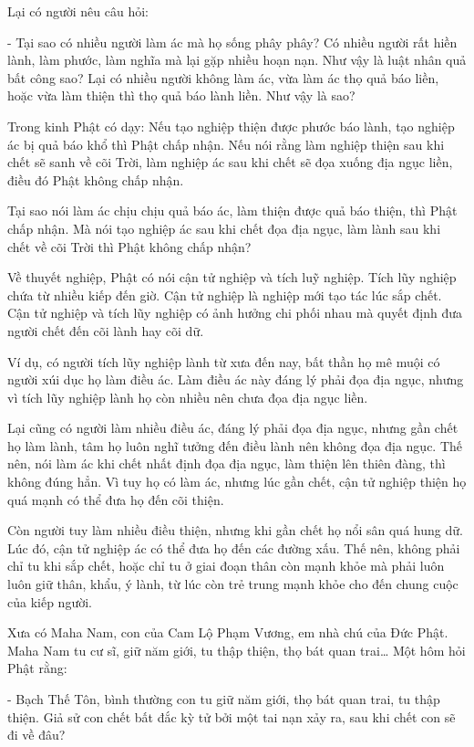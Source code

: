 \documentclass[
  12pt,
  oneside]{book}
\begin{document}
Lại có người nêu câu hỏi:

- Tại sao có nhiều người làm ác mà họ sống phây phây? Có nhiều người rất hiền lành, làm phước, làm nghĩa mà lại gặp nhiều hoạn nạn. Như vậy là luật nhân quả bất công sao? Lại có nhiều người không làm ác, vừa làm ác thọ quả báo liền, hoặc vừa làm thiện thì thọ quả báo lành liền. Như vậy là sao?

Trong kinh Phật có dạy: Nếu tạo nghiệp thiện được phước báo lành, tạo nghiệp ác bị quả báo khổ thì Phật chấp nhận. Nếu nói rằng làm nghiệp thiện sau khi chết sẽ sanh về cõi Trời, làm nghiệp ác sau khi chết sẽ đọa xuống địa ngục liền, điều đó Phật không chấp nhận.

Tại sao nói làm ác chịu chịu quả báo ác, làm thiện được quả báo thiện, thì Phật chấp nhận. Mà nói tạo nghiệp ác sau khi chết đọa địa ngục, làm lành sau khi chết về cõi Trời thì Phật không chấp nhận?

Về thuyết nghiệp, Phật có nói cận tử nghiệp và tích luỹ nghiệp. Tích lũy nghiệp chứa từ nhiều kiếp đến giờ. Cận tử nghiệp là nghiệp mới tạo tác lúc sắp chết. Cận tử nghiệp và tích lũy nghiệp có ảnh hưởng chi phối nhau mà quyết định đưa người chết đến cõi lành hay cõi dữ.

Ví dụ, có người tích lũy nghiệp lành từ xưa đến nay, bất thần họ mê muội có người xúi dục họ làm điều ác. Làm điều ác này đáng lý phải đọa địa ngục, nhưng vì tích lũy nghiệp lành họ còn nhiều nên chưa đọa địa ngục liền.

Lại cũng có người làm nhiều điều ác, đáng lý phải đọa địa ngục, nhưng gần chết họ làm lành, tâm họ luôn nghĩ tưởng đến điều lành nên không đọa địa ngục. Thế nên, nói làm ác khi chết nhất định đọa địa ngục, làm thiện lên thiên đàng, thì không đúng hẳn. Vì tuy họ có làm ác, nhưng lúc gần chết, cận tử nghiệp thiện họ quá mạnh có thể đưa họ đến cõi thiện.

Còn người tuy làm nhiều điều thiện, nhưng khi gần chết họ nổi sân quá hung dữ. Lúc đó, cận tử nghiệp ác có thể đưa họ đến các đường xấu. Thế nên, không phải chỉ tu khi sắp chết, hoặc chỉ tu ở giai đoạn thân còn mạnh khỏe mà phải luôn luôn giữ thân, khẩu, ý lành, từ lúc còn trẻ trung mạnh khỏe cho đến chung cuộc của kiếp người.

Xưa có Maha Nam, con của Cam Lộ Phạm Vương, em nhà chú của Đức Phật. Maha Nam tu cư sĩ, giữ năm giới, tu thập thiện, thọ bát quan trai\ldots{} Một hôm hỏi Phật rằng:

- Bạch Thế Tôn, bình thường con tu giữ năm giới, thọ bát quan trai, tu thập thiện. Giả sử con chết bất đắc kỳ tử bởi một tai nạn xảy ra, sau khi chết con sẽ đi về đâu?
\end{document}
